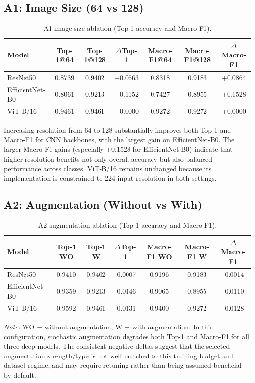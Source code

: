 \documentclass[11pt]{article}
\begin{document}
\subsection{A1: Image Size (64 vs 128)}
\begin{table}[H]
\centering
\caption{A1 image-size ablation (Top-1 accuracy and Macro-F1).}
\begin{tabular}{lcccccc}
\toprule
Model & Top-1@64 & Top-1@128 & $\Delta$Top-1 & Macro-F1@64 & Macro-F1@128 & $\Delta$Macro-F1 \\
\midrule
ResNet50 & 0.8739 & 0.9402 & +0.0663 & 0.8318 & 0.9183 & +0.0864 \\
EfficientNet-B0 & 0.8061 & 0.9213 & +0.1152 & 0.7427 & 0.8955 & +0.1528 \\
ViT-B/16 & 0.9461 & 0.9461 & +0.0000 & 0.9272 & 0.9272 & +0.0000 \\
\bottomrule
\end{tabular}
\end{table}
Increasing resolution from 64 to 128 substantially improves both Top-1 and Macro-F1 for CNN backbones, with the largest gain on EfficientNet-B0. The larger Macro-F1 gains (especially +0.1528 for EfficientNet-B0) indicate that higher resolution benefits not only overall accuracy but also balanced performance across classes. ViT-B/16 remains unchanged because its implementation is constrained to 224 input resolution in both settings.

\subsection{A2: Augmentation (Without vs With)}
\begin{table}[H]
\centering
\caption{A2 augmentation ablation (Top-1 accuracy and Macro-F1).}
\begin{tabular}{lcccccc}
\toprule
Model & Top-1 WO & Top-1 W & $\Delta$Top-1 & Macro-F1 WO & Macro-F1 W & $\Delta$Macro-F1 \\
\midrule
ResNet50 & 0.9410 & 0.9402 & -0.0007 & 0.9196 & 0.9183 & -0.0014 \\
EfficientNet-B0 & 0.9359 & 0.9213 & -0.0146 & 0.9065 & 0.8955 & -0.0110 \\
ViT-B/16 & 0.9592 & 0.9461 & -0.0131 & 0.9400 & 0.9272 & -0.0128 \\
\bottomrule
\end{tabular}
\end{table}
\noindent\textit{Note:} WO = without augmentation, W = with augmentation.
In this configuration, stochastic augmentation degrades both Top-1 and Macro-F1 for all three deep models. The consistent negative deltas suggest that the selected augmentation strength/type is not well matched to this training budget and dataset regime, and may require retuning rather than being assumed beneficial by default.
\end{document}
